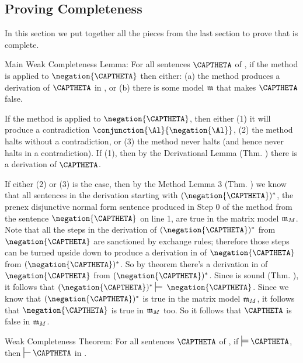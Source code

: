 \subsection{Proving Completeness}
In this section we put together all the pieces from the last section to prove that \GQD{} is complete. 
\begin{THEOREM}{ Main Weak \GQD{} Completeness Lemma:}
For all sentences $\CAPTHETA$ of \GQL{}, if the method is applied to $\negation{\CAPTHETA}$ then either: (a) the method produces a derivation of $\CAPTHETA$ in \GQDP{}, or (b) there is some model $\mathfrak{m}$ that makes $\CAPTHETA$ false.
\end{THEOREM}
\begin{PROOF}
If the method is applied to $\negation{\CAPTHETA}$, then either (1) it will produce a contradiction $\conjunction{\Al}{\negation{\Al}}$, (2) the method halts without a contradiction, or (3) the method never halts (and hence never halts in a contradiction). 
If (1), then by the Derivational Lemma (Thm. ) there is a derivation of $\CAPTHETA$. 

If either (2) or (3) is the case, then by the Method Lemma 3 (Thm. ) we know that all sentences in the derivation starting with $(\negation{\CAPTHETA})^*$, the prenex disjunctive normal form sentence produced in Step 0 of the method from the sentence $\negation{\CAPTHETA}$ on line 1, are true in the matrix model $\mathfrak{m}_M$. 
Note that all the steps in the derivation of $(\negation{\CAPTHETA})^*$ from $\negation{\CAPTHETA}$ are sanctioned by exchange rules;
therefore those steps can be turned upside down to produce a derivation in \GQDP{} of $\negation{\CAPTHETA}$ from $(\negation{\CAPTHETA})^*$. 
So by theorem  there's a derivation in \GQD{} of $\negation{\CAPTHETA}$ from $(\negation{\CAPTHETA})^*$.
Since \GQD{} is sound (Thm. ), it follows that $(\negation{\CAPTHETA})^*\sdtstile{}{}\;\negation{\CAPTHETA}$.
Since we know that $(\negation{\CAPTHETA})^*$ is true in the matrix model $\mathfrak{m}_M$, it follows that $\negation{\CAPTHETA}$ is true in $\mathfrak{m}_M$ too.
So it follows that $\CAPTHETA$ is false in $\mathfrak{m}_M$. 
\end{PROOF}
\begin{THEOREM}{ Weak \GQD{} Completeness Theorem:}
For all sentences $\CAPTHETA$ of \GQL{}, if $\sdtstile{}{}\CAPTHETA$, then $\sststile{}{}\CAPTHETA$ in \GQD{}.
\end{THEOREM}
